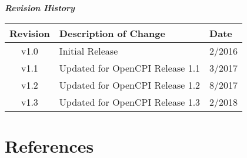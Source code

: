 \maketitle
\thispagestyle{fancy}
\newpage

	\begin{center}
	\textit{\textbf{Revision History}}
		\begin{table}[H] %
		\label{table:revisions}
		\centering
			\begin{tabularx}{.7\textwidth}{|c|X|l|}
			\hline
			\rowcolor{blue}
			\textbf{Revision} & \textbf{Description of Change} & \textbf{Date} \\
		    \hline
			v1.0 & Initial Release & 2/2016 \\
		    \hline
			v1.1 & Updated for OpenCPI Release 1.1 & 3/2017 \\
			\hline
			v1.2 & Updated for OpenCPI Release 1.2 & 8/2017 \\
			\hline
			v1.3 & Updated for OpenCPI Release 1.3 & 2/2018 \\
			\hline
			\end{tabularx}
		\end{table}
	\end{center}

\newpage

\tableofcontents

\newpage


\listoftables

\newpage

\section{References}

